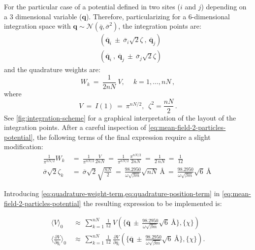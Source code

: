 \documentclass{article}
\begin{document}
For the particular case of a potential defined in two sites ($i$ and $j$) depending on a 3 dimensional variable ($\mathbf{q}$). Therefore, particularizing for a 6-dimensional integration space with $\mathbf{q} \sim \mathcal{N}(\overline{q} , \overline{\sigma}^{2})$, the integration points are:
\begin{subequations}
\begin{align}
    & (\overline{\mathbf{q}}_i\ \pm\ \overline{\sigma}_i\sqrt{2}\zeta\ ,\ \overline{\mathbf{q}}_j) \nonumber\\
    & (\overline{\mathbf{q}}_i\ ,\ \overline{\mathbf{q}}_j\ \pm\ \overline{\sigma}_j\sqrt{2}\zeta)  \nonumber
\end{align}
\end{subequations}
and the quadrature weights are:
\begin{equation}
    W_k\ =\ \frac{1}{2nN}\ V,\ \quad k = 1, \ldots, nN \,,
\end{equation}
where
\begin{equation}
    V\ =\ I(1)\ =\ \pi^{nN/2},\,\,\,\zeta^2 = \frac{nN}{2}\,.
\end{equation}
See \cref{fig:integration-scheme} for a graphical interpretation of the layout of the integration points. After a careful inspection of \cref{eq:mean-field-2-particles-potential}, the following terms of the final expression require a slight modification:
\begin{align}
\label{eq:quadrature-weight-term}
\frac{1}{\pi^{n N/2}} W_k\ &=\ \frac{1}{\pi^{n N/2}} \frac{V}{2nN}\ =\ \frac{1}{\pi^{n N/2}} \frac{\pi^{nN/2}}{2nN}\ =\ \frac{1}{2\ nN}\ =\ \frac{1}{12} \\
\label{eq:quadrature-position-term}
\overline{\sigma}\sqrt{2}\zeta_k\ &=\ \overline{\sigma}\sqrt{2} \sqrt{\frac{nN}{2}}\ =\ \frac{98.2950}{\omega \sqrt{\beta m}} \sqrt{nN}\ \si{\angstrom}\ =\ \frac{98.2950}{\omega \sqrt{\beta m}} \sqrt{6}\ \si{\angstrom}\
\end{align}

Introducing \cref{eq:quadrature-weight-term,eq:quadrature-position-term} in \cref{eq:mean-field-2-particles-potential} the resulting expression to be implemented is:

\begin{align}
  \langle V \rangle_0\ &\approx\ \sum_{k=1}^{nN} \frac{1}{12}\ V(\{{\overline{\mathbf{q}}\ \pm\ \frac{98.2950}{\omega \sqrt{\beta m}} \sqrt{6}}\ \si{\angstrom}\}, \{{\chi}\})\\
  \langle \frac{\partial V}{\partial q_i} \rangle_0\ &\approx\ \sum_{k=1}^{nN} \frac{1}{12}\ \frac{\partial V}{\partial q_i} (\{{\overline{\mathbf{q}}\ \pm\ \frac{98.2950}{\omega \sqrt{\beta m}} \sqrt{6}}\ \si{\angstrom} \}, \{{\chi}\}).
\end{align}
\end{document}
